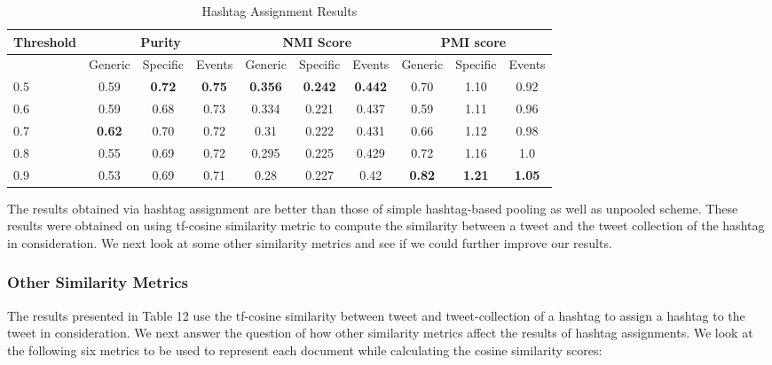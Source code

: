 \documentclass[10pt,a5paper,twoside]{article}
\begin{document}
\begin{table}[!h]
\setcounter{table}{11}
\centering
\resizebox{14cm}{!} 
{
	\begin{tabular}{|l|ccc|ccc|ccc|}
	\hline
	\footnotesize{Threshold}  & \multicolumn {3}{c}{Purity} & \multicolumn {3}{c}{NMI Score} & \multicolumn {3}{c|}{PMI score}\\
	\hline
	 & Generic & Specific & Events &  Generic & Specific & Events &  Generic & Specific & Events\\
	\hline
	0.5 & 0.59 & \textbf{0.72} & \textbf{0.75} & \textbf{0.356} & \textbf{0.242} & \textbf{0.442} & 0.70 & 1.10 & 0.92 \\
	\hline
	0.6 & 0.59 & 0.68 & 0.73 & 0.334 & 0.221 & 0.437 & 0.59 & 1.11 & 0.96 \\
	\hline
	0.7 & \textbf{0.62} & 0.70 & 0.72 & 0.31 & 0.222 & 0.431 & 0.66 & 1.12 & 0.98 \\
	\hline
	0.8 & 0.55 & 0.69 & 0.72 & 0.295 & 0.225 & 0.429 & 0.72 & 1.16 & 1.0 \\
	\hline
	0.9 & 0.53 & 0.69 & 0.71 & 0.28 & 0.227 & 0.42 & \textbf{0.82} & \textbf{1.21} & \textbf{1.05} \\
	\hline
	\end{tabular}
}
\caption{Hashtag Assignment Results}\label{Table}
\end{table}

The results obtained via hashtag assignment are better than those of simple hashtag-based pooling as well as unpooled scheme. These results were obtained on using tf-cosine similarity metric to compute the similarity between a tweet and the tweet collection of the hashtag in consideration. We next look at some other similarity metrics and see if we could further improve our results.

\subsubsection{Other Similarity Metrics}
The results presented in Table 12 use the tf-cosine similarity between tweet and tweet-collection of a hashtag to assign a hashtag to the tweet in  consideration. We next answer the question of how other similarity metrics affect the results of hashtag assignments. We look at the following six metrics to be used to represent each document while calculating the cosine similarity scores:
\end{document}
